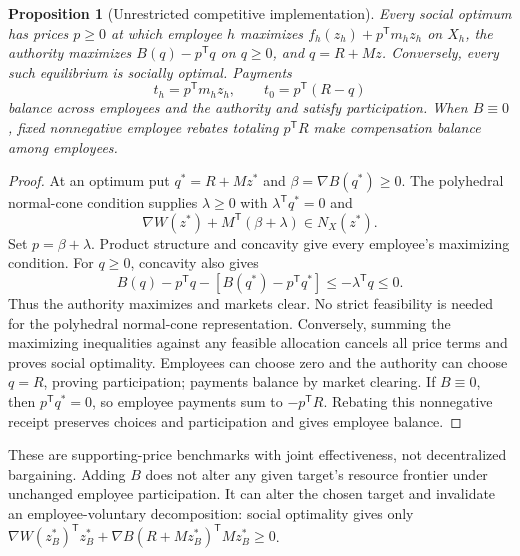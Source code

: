 \documentclass[ecta,draft,supplement]{econsocart}
\newtheorem{proposition}[theorem]{Proposition}
\theoremstyle{definition}
\theoremstyle{definition}
\begin{document}
\begin{appendix}
\begin{proposition}[Unrestricted competitive implementation]
\label{prop:publiccompetitive}
Every social optimum has prices $p\geq0$ at which employee $h$ maximizes
$f_h(z_h)+p^{\mathsf T}m_hz_h$ on $X_h$, the authority maximizes
$B(q)-p^{\mathsf T}q$ on $q\geq0$, and $q=R+Mz$. Conversely, every
such equilibrium is socially optimal. Payments
\begin{equation}
 t_h=p^{\mathsf T}m_hz_h,\qquad
 t_0=p^{\mathsf T}(R-q)
 \label{eq:publiccompetitivepayments}
\end{equation}
balance across employees and the authority and satisfy participation.
When $B\equiv0$, fixed nonnegative employee rebates totaling
$p^{\mathsf T}R$ make compensation balance among employees.
\end{proposition}
\begin{proof}
At an optimum put $q^*=R+Mz^*$ and $\beta=\nabla B(q^*)\geq0$.
The polyhedral normal-cone condition supplies $\lambda\geq0$ with
$\lambda^{\mathsf T}q^*=0$ and
\[
 \nabla W(z^*)+M^{\mathsf T}(\beta+\lambda)\in N_X(z^*).
\]
Set $p=\beta+\lambda$. Product structure and concavity give every
employee's maximizing condition. For $q\geq0$, concavity also gives
\[
 B(q)-p^{\mathsf T}q-[B(q^*)-p^{\mathsf T}q^*]
 \leq-\lambda^{\mathsf T}q\leq0.
\]
Thus the authority maximizes and markets clear. No strict feasibility is
needed for the polyhedral normal-cone representation. Conversely, summing
the maximizing inequalities against any feasible allocation cancels all
price terms and proves social optimality. Employees can choose zero and
the authority can choose $q=R$, proving participation; payments balance
by market clearing. If $B\equiv0$, then $p^{\mathsf T}q^*=0$, so
employee payments sum to $-p^{\mathsf T}R$. Rebating this nonnegative
receipt preserves choices and participation and gives employee balance.
\end{proof}

These are supporting-price benchmarks with joint effectiveness, not
decentralized bargaining. Adding $B$ does not alter any given target's
resource frontier under unchanged employee participation. It can alter
the chosen target and invalidate an employee-voluntary decomposition:
social optimality gives only
$\nabla W(z_B^*)^{\mathsf T}z_B^*
+\nabla B(R+Mz_B^*)^{\mathsf T}Mz_B^*\geq0$.


\end{appendix}
\end{document}
